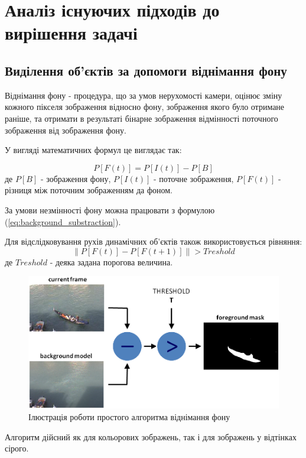 \section{Аналіз існуючих підходів до вирішення задачі}
\subsection{Виділення об'єктів за допомоги віднімання фону}
Віднімання фону - процедура, що за умов нерухомості камери, оцінює зміну кожного пікселя зображення відносно фону, зображення якого було отримане раніше, та отримати в результаті бінарне зображення відмінності поточного зображення від зображення фону.

У вигляді математичних формул це виглядає так:

\begin{equation}
\label{eq:background_substraction}
P[F(t)] = P[I(t)] - P[B]
\end{equation}
де $P[B]$ - зображення фону, $P[I(t)]$ - поточне зображення, $P[F(t)]$ - різниця між поточним зображенням да фоном.

За умови незмінності фону можна працювати з формулою (\ref{eq:background_substraction}).

Для відслідковування рухів динамічних об'єктів також використовується рівняння:
\begin{equation}
\label{eq:frames_difference}
\|P[F(t)] - P[F(t+1)]\| > Treshold
\end{equation}
де $Treshold$ - деяка задана порогова величина.

\begin{figure}[H]
	\includegraphics[width=0.9\linewidth]{task_analysis/img/background_substraction}
	\caption{Ілюстрація роботи простого алгоритма віднімання фону}
\end{figure}

Алгоритм дійсний як для кольорових зображень, так і для зображень у відтінках сірого.

